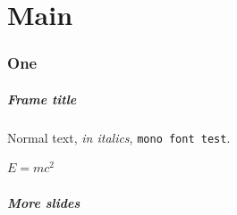 \documentclass[topmenu]{taltechslides}
\begin{document}
\maketitle

\part{Main}

\section{One}

\begin{frame}[fragile]
    \frametitle{Frame title}

    Normal text, \textit{in italics}, \texttt{mono font test}.

    \(E=mc^2\)

\end{frame}


{%
    \beamertemplatenavigationsymbolsempty
    \begin{frame}[plain]\end{frame}
}

\begin{frame}[fragile]
    \frametitle{More slides}

    

\end{frame}
\end{document}
